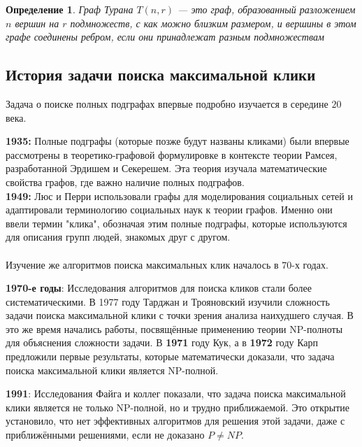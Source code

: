 \documentclass{article}
\newtheorem{theorem}{Определение}
\begin{document}
\begin{theorem}
Граф Турана $T(n,r)$ — это граф, образованный разложением $n$ вершин на $r$ подмножеств, с как можно близким размером, и вершины в этом графе соединены ребром, если они принадлежат разным подмножествам
\end{theorem} \newline

\subsection{История задачи поиска максимальной клики}

Задача о поиске полных подграфах впервые подробно изучается в середине $20$ века.

\textbf{1935:} Полные подграфы (которые позже будут названы кликами) были впервые рассмотрены в теоретико-графовой формулировке в контексте теории Рамсея, разработанной Эрдишем и Секерешем. Эта теория изучала математические свойства графов, где важно наличие полных подграфов.\\
\textbf{1949:} Люс и Перри использовали графы для моделирования социальных сетей и адаптировали терминологию социальных наук к теории графов. Именно они ввели термин "клика", обозначая этим полные подграфы, которые используются для описания групп людей, знакомых друг с другом.\\\\
Изучение же алгоритмов поиска максимальных клик началось в $70$-х годах.

\textbf{1970-е годы}: Исследования алгоритмов для поиска кликов стали более систематическими. В 1977 году Тарджан и Трояновский изучили сложность задачи поиска максимальной клики с точки зрения анализа наихудшего случая.
В это же время начались работы, посвящённые применению теории NP-полноты для объяснения сложности задачи. В \textbf{1971} году Кук, а в \textbf{1972} году Карп предложили первые результаты, которые математически доказали, что задача поиска максимальной клики является NP-полной.

\textbf{1991}: Исследования Файга и коллег показали, что задача поиска максимальной клики является не только NP-полной, но и трудно приближаемой. Это открытие установило, что нет эффективных алгоритмов для решения этой задачи, даже с приближёнными решениями, если не доказано $P \neq NP$.
\end{document}
